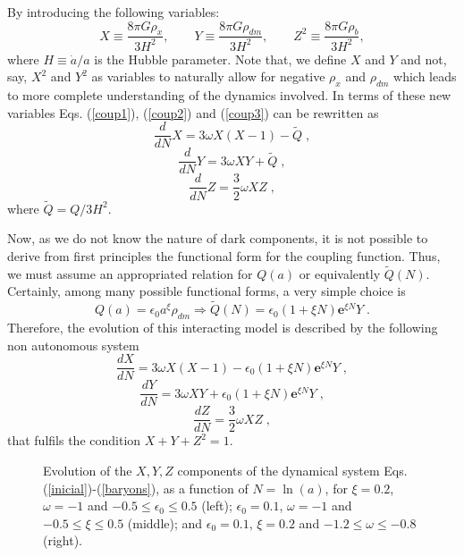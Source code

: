 \documentclass[twocolumn,preprintnumbers,amsmath,amssymb]{revtex4}
\begin{document}
By introducing the following variables:
\begin{equation}\label{def5}
X \equiv \frac{8\pi G{\rho}_{x}}{3H^{2}}, \quad \quad Y \equiv \frac{8\pi G{\rho}_{dm}}{3H^{2}}, \quad \quad Z^{2} \equiv \frac{8\pi G{\rho}_{b}}{3H^{2}},
\end{equation}
where $H \equiv \dot{a}/a$ is the Hubble parameter. Note that, we define $X$ and $Y$ and not, say, $X^2$ and $Y^2$ as 
variables to naturally allow for negative $\rho_x$ and $\rho_{dm}$ which leads to more complete understanding
of the dynamics involved. In terms of these new variables Eqs. (\ref{coup1}), (\ref{coup2}) and (\ref{coup3}) can 
be rewritten as
\begin{equation}
\frac{d}{dN}X = 3\omega X(X-1) - \tilde{Q}\;,
\end{equation}
\begin{equation}
\frac{d}{dN}Y = 3\omega XY + \tilde{Q}\;,
\end{equation}
\begin{equation}
\frac{d}{dN} Z = \frac{3}{2}\omega XZ\;,
\end{equation}
where $\tilde{Q} = Q/3H^{2}$.

Now, as we do not know the nature of dark components, it is not possible to derive from first principles the functional
form for the coupling function. Thus, we must assume an appropriated relation for $Q(a)$ or equivalently $\tilde{Q}(N)$. 
Certainly, among many possible functional forms, a very simple choice is
\begin{equation}
Q(a)=\epsilon_{0}a^{\xi}\rho_{dm}\Longrightarrow\tilde{Q}(N)=\epsilon_{0}\left(1+\xi N\right)\mathbf{e}^{\xi N}Y\;.\label{eq:11}
\end{equation}
Therefore, the evolution of this interacting model is described by the following non autonomous system
\begin{equation}
\frac{dX}{dN}=3\omega X\left(X-1\right)-\epsilon_{0}\left(1+\xi N\right)\mathbf{e}^{\xi N}Y\label{inicial}\;,
\end{equation}
\begin{equation}
\frac{dY}{dN}=3\omega XY+\epsilon_{0}\left(1+\xi N\right)\mathbf{e}^{\xi N}Y\label{dmatter}\;,
\end{equation}
\begin{equation}
\frac{dZ}{dN}=\frac{3}{2}\omega XZ\label{baryons}\;,
\end{equation}
that fulfils the condition $X+Y+Z^{2}=1$.


\begin{figure*}
\centerline{
}
\caption{Evolution of the $X,Y,Z$ components of the dynamical system Eqs. (\ref{inicial})-(\ref{baryons}), as a function of $N=\ln(a)$, for $\xi = 0.2$, $\omega = -1$ and $-0.5 \leq \epsilon_0 \leq 0.5$ (left);
$\epsilon_0 = 0.1$, $\omega = -1$ and $-0.5 \leq \xi \leq 0.5$ (middle); and $\epsilon_0 = 0.1$, $\xi = 0.2$ and $-1.2 \leq \omega \leq -0.8$ (right).}
\label{fig1}
\end{figure*}
\end{document}
